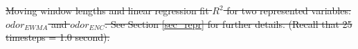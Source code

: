\documentclass[5p,twocolumn,authoryear]{elsarticle}
\providecommand{\DIFdeltex}[1]{{\protect\color{red}\sout{#1}}}                      %
\providecommand{\DIFdelend}{} %
\providecommand{\DIFdelFL}[1]{\DIFdel{#1}} %
\providecommand{\DIFdel}[1]{\texorpdfstring{\DIFdeltex{#1}}{}} %
\DeclareRobustCommand{\DIFdelend}{\DIFOaddend \let\includegraphics\DIFOincludegraphics} %
\begin{document}
{%
\DIFdelFL{Moving window lengths and linear regression fit $R^2$ for two represented variables: $odor_{EWMA}$ and $odor_{ENC}$. 
    See Section \ref{sec_repr} for further details. 
    (Recall that 25 timesteps = 1.0 second).
    }}
\DIFdelend %
\end{document}
